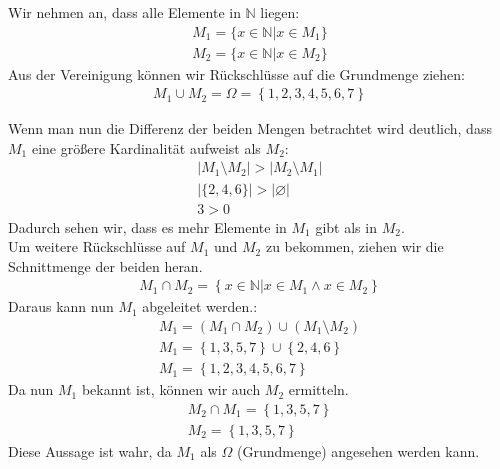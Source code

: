 Wir nehmen an, dass alle Elemente in $\mathbb{N}$ liegen:\\
\begin{eqnarray}
	M_1 = \{x \in \mathbb{N} | x \in M_1 \}\\
	M_2 = \{x \in \mathbb{N} | x \in M_2 \}
\end{eqnarray}
Aus der Vereinigung können wir Rückschlüsse auf die Grundmenge ziehen: \\

\begin{eqnarray}
	M_1 \cup M_2 = \Omega = \left\{ 1,2,3,4,5,6,7 \right\}
\end{eqnarray}

Wenn man nun die Differenz der beiden Mengen betrachtet wird deutlich, dass $M_1$ eine größere Kardinalität aufweist als $M_2$:
\begin{eqnarray}
	\vert M_1 \setminus M_2 \vert > \vert M_2 \setminus M_1 \vert\\
	\vert \{2,4,6\} \vert > \vert \varnothing \vert \\
	3 > 0
\end{eqnarray}
Dadurch sehen wir, dass es mehr Elemente in $M_1$ gibt als in $M_2$. \\
Um weitere Rückschlüsse auf $M_1$ und $M_2$ zu bekommen, ziehen wir die Schnittmenge der beiden heran. 
\begin{eqnarray}
	M_1 \cap M_2 = \left\{x \in \mathbb{N} \vert x \in M_1 \land x \in M_2 \right\}
\end{eqnarray}
Daraus kann nun $M_1$ abgeleitet werden.: 
\begin{eqnarray}
	M_1 = (M_1 \cap M_2) \cup  ( M_1 \setminus M_2) \\
	M_1 = \left\{ 1,3,5,7 \right\} \cup \left\{ 2,4,6 \right\}\\
	M_1 = \left\{ 1,2,3,4,5,6,7 \right\}
\end{eqnarray}
Da nun $M_1$ bekannt ist, können wir auch $M_2$ ermitteln.
\begin{eqnarray}
	M_2 \cap M_1 = \left\{ 1,3,5,7       \right\}\\
	M_2 = \left\{ 1,3,5,7       \right\}
\end{eqnarray}
Diese Aussage ist wahr, da $M_1$ als $\Omega$ (Grundmenge) angesehen werden kann.


